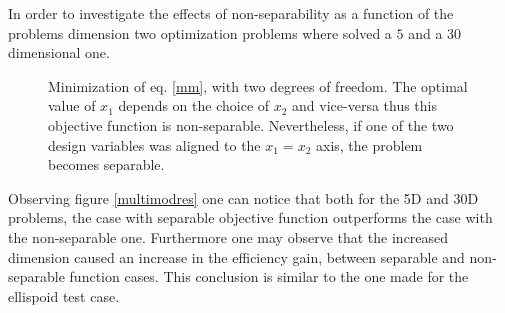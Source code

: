 In order to investigate the effects of non-separability as a function of the problems dimension two optimization problems where solved a $5$ and a $30$ dimensional one.  
\begin{figure}[h!]
\begin{minipage}[b]{1\linewidth}
 \centering
\end{minipage}
\caption{Minimization of eq. \ref{mm}, with  two degrees of freedom. The optimal value of $x_1$  depends on the choice of $x_2$ and vice-versa thus this objective function is non-separable. Nevertheless, if one of the two design variables was aligned to the $x_1=x_2$ axis, the problem becomes separable.} 

\label{multimod}
\end{figure}

Observing figure \ref{multimodres} one can notice that both for the 5D and 30D problems, the case with separable objective function outperforms the case with the non-separable one. Furthermore one may observe that the increased dimension caused an increase in the efficiency gain, between separable and non-separable function cases. This conclusion is similar to the one made for the ellispoid test case. 



